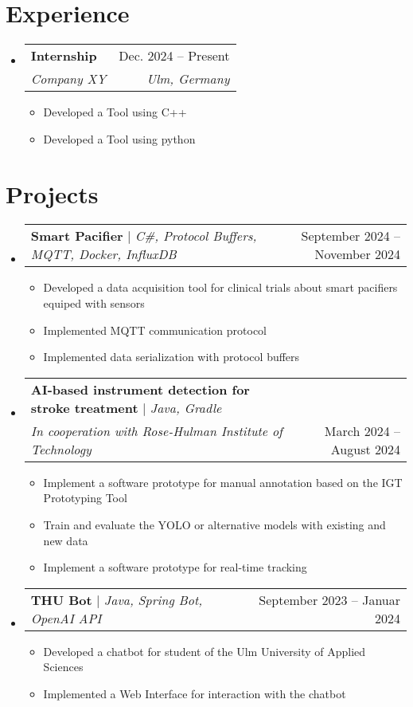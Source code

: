 \documentclass[letterpaper,12pt]{article}
\makeatletter
\newcommand{\resumeItem}[1]{
\item\small{
    {#1 \vspace{-2pt}}
  }
}
\newcommand{\resumeSubheading}[4]{
  \vspace{-2pt}\item
  \begin{tabular*}{0.97\textwidth}[t]{l@{\extracolsep{\fill}}r}
    \textbf{#1} & #2 \\
    \textit{\small#3} & \textit{\small #4} \\
  \end{tabular*}\vspace{-7pt}
}
\newcommand{\resumeSubSubheading}[2]{
\item
  \begin{tabular*}{0.97\textwidth}{l@{\extracolsep{\fill}}r}
    \textit{\small#1} & \textit{\small #2} \\
  \end{tabular*}\vspace{-7pt}
}
\newcommand{\resumeProjectHeading}[2]{
\item
  \begin{tabular*}{0.97\textwidth}{l@{\extracolsep{\fill}}r}
    \small#1 & #2 \\
  \end{tabular*}\vspace{-7pt}
}
\newcommand{\resumeSubHeadingListStart}{\begin{itemize}[leftmargin=0.15in, label={}]}
\newcommand{\resumeSubHeadingListEnd}{\end{itemize}}
\newcommand{\resumeItemListStart}{\begin{itemize}}
\newcommand{\resumeItemListEnd}{\end{itemize}\vspace{-5pt}}
\makeatother
\begin{document}
\section{Experience}
  \resumeSubHeadingListStart

    \resumeSubheading
      {Internship}{Dec. 2024 -- Present}
      {Company XY}{Ulm, Germany}
      \resumeItemListStart
        \resumeItem{Developed a Tool using C++}
        \resumeItem{Developed a Tool using python}
      \resumeItemListEnd
        

  \resumeSubHeadingListEnd


\section{Projects}
    \resumeSubHeadingListStart
      \resumeProjectHeading
          {\textbf{Smart Pacifier} $|$ \emph{C\#, Protocol Buffers, MQTT, Docker, InfluxDB}}{September 2024 -- November 2024}
          \resumeItemListStart
            \resumeItem{Developed a data acquisition tool for clinical trials about smart pacifiers equiped with sensors}
            \resumeItem{Implemented MQTT communication protocol}
            \resumeItem{Implemented data serialization with protocol buffers}
          \resumeItemListEnd
      \resumeProjectHeading
      {\textbf{AI-based instrument detection for stroke treatment} $|$ \emph{Java, Gradle} \\
       \textit{In cooperation with Rose-Hulman Institute of Technology}}{March 2024 -- August 2024}
          \resumeItemListStart
            \resumeItem{Implement a software prototype for manual annotation based on the IGT Prototyping Tool}
            \resumeItem{Train and evaluate the YOLO or alternative models with existing and new data}
            \resumeItem{Implement a software prototype for real-time tracking}
          \resumeItemListEnd
            
       \resumeProjectHeading
          {\textbf{THU Bot} $|$ \emph{Java, Spring Bot, OpenAI API}}{September 2023 -- Januar 2024}
          \resumeItemListStart
            \resumeItem{Developed a chatbot for student of the Ulm University of Applied Sciences}
            \resumeItem{Implemented a Web Interface for interaction with the chatbot}
          \resumeItemListEnd            
    \resumeSubHeadingListEnd
\end{document}
